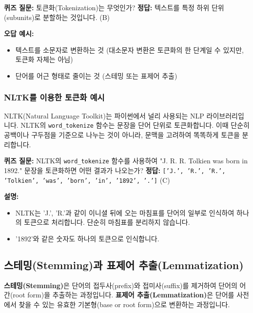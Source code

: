 \documentclass[11pt,a4paper]{article}
\begin{document}
\begin{examplebox}
\textbf{퀴즈 질문:} 토큰화(Tokenization)는 무엇인가?
\textbf{정답:} 텍스트를 특정 하위 단위(subunits)로 분할하는 것입니다. (B)

\textbf{오답 예시:}
\begin{itemize}
    \item 텍스트를 소문자로 변환하는 것 (대소문자 변환은 토큰화의 한 단계일 수 있지만, 토큰화 자체는 아님)
    \item 단어를 어근 형태로 줄이는 것 (스테밍 또는 표제어 추출)
\end{itemize}
\end{examplebox}

\subsubsection{NLTK를 이용한 토큰화 예시}

NLTK(Natural Language Toolkit)는 파이썬에서 널리 사용되는 NLP 라이브러리입니다. NLTK의 \texttt{word\_tokenize} 함수는 문장을 단어 단위로 토큰화합니다. 이때 단순히 공백이나 구두점을 기준으로 나누는 것이 아니라, 문맥을 고려하여 똑똑하게 토큰을 분리합니다.

\begin{examplebox}
\textbf{퀴즈 질문:} NLTK의 \texttt{word\_tokenize} 함수를 사용하여 "J. R. R. Tolkien was born in 1892." 문장을 토큰화하면 어떤 결과가 나오는가?
\textbf{정답:} \texttt{['J.', 'R.', 'R.', 'Tolkien', 'was', 'born', 'in', '1892', '.']} (C)

\textbf{설명:}
\begin{itemize}
    \item NLTK는 'J.', 'R.'과 같이 이니셜 뒤에 오는 마침표를 단어의 일부로 인식하여 하나의 토큰으로 처리합니다. 단순히 마침표를 분리하지 않습니다.
    \item '1892'와 같은 숫자도 하나의 토큰으로 인식합니다.
\end{itemize}
\end{examplebox}

\subsection{스테밍(Stemming)과 표제어 추출(Lemmatization)}

\begin{conceptbox}
\textbf{스테밍(Stemming)}은 단어의 접두사(prefix)와 접미사(suffix)를 제거하여 단어의 어간(root form)을 추출하는 과정입니다. \textbf{표제어 추출(Lemmatization)}은 단어를 사전에서 찾을 수 있는 유효한 기본형(base or root form)으로 변환하는 과정입니다.
\end{conceptbox}
\end{document}
